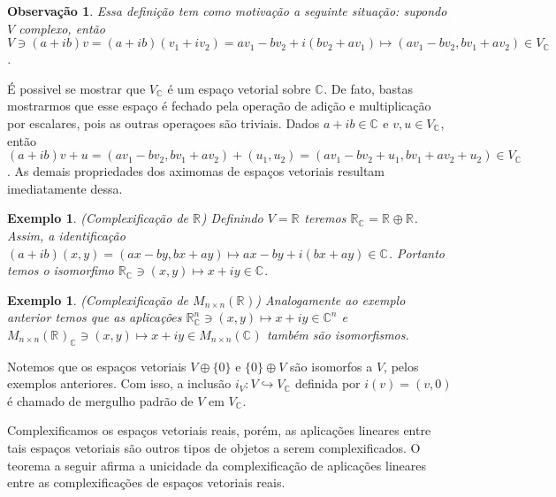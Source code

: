 \documentclass[12pt]{book}
\newtheorem{exemplo}[teorema]{Exemplo}
\newtheorem{observacao}[teorema]{Observação}
\newcommand{\complexificacao}[1]{#1_{\complexo{}}}
\newcommand{\complexo}[1]{\mathbb{C}^{#1}}
\newcommand{\matrizquadcomplexa}[1]{M_{#1 \times #1}(\complexo{})}
\newcommand{\matrizquadreal}[1]{M_{#1 \times #1}(\real{})}
\newcommand{\real}[1]{\mathbb{R}^{#1}}
\newcommand{\reta}{\real{}}
\begin{document}
	\begin{observacao}
		Essa definição tem como motivação a seguinte situação: supondo $V$ complexo, então $V \ni (a+ib)v = (a+ib)(v_{1}+iv_{2}) = av_{1}-bv_{2}+i(bv_{2}+av_{1}) \mapsto (av_{1}-bv_{2}, bv_{1}+ av_{2}) \in \complexificacao{V}$.
	\end{observacao}
	
	É possivel se mostrar que $\complexificacao{V}$ é um espaço vetorial sobre $\complexo{}$. De fato, bastas mostrarmos que esse espaço é fechado pela operação de adição e multiplicação por escalares, pois as outras operaçoes são triviais. Dados $a+ib \in \complexo{}$ e $v,u \in \complexificacao{V}$, então $(a+ib )v+u = (av_{1}-bv_{2}, bv_{1}+ av_{2}) + (u_{1}, u_{2}) = (av_{1}-bv_{2} + u_{1}, bv_{1}+ av_{2} + u_{2}) \in \complexificacao{V}$. As demais propriedades dos aximomas de espaços vetoriais resultam imediatamente dessa.
	
	\begin{exemplo}\label{exemplo_conjugado_reta_real}
		(Complexificação de $\reta$) Definindo $V = \reta$ teremos $\complexificacao{\reta} = \reta\oplus \reta$. Assim, a identificação $(a+ib)(x, y ) = (ax-by, bx+ay) \mapsto ax-by+i(bx+ay) \in \complexo{}$. Portanto temos o isomorfimo $\complexificacao{\reta} \ni (x,y)\mapsto x +iy\in \complexo{}$.
	\end{exemplo}
	
	\begin{exemplo}\label{exemplo_complexificacao_matrizes}
		(Complexificação de $\matrizquadreal{n}$) Analogamente ao exemplo anterior temos que as aplicações $\complexificacao{\real{n}} \ni (x,y) \mapsto x+iy \in \complexo{n}$ e  $\complexificacao{\matrizquadreal{n}} \ni (x,y) \mapsto x+iy \in \matrizquadcomplexa{n}$ também são isomorfismos.
	\end{exemplo}
	
	Notemos que os espaços vetoriais $V\oplus\{0\}$ e $\{0\}\oplus V$ são isomorfos a $V$, pelos exemplos anteriores. Com isso, a inclusão $i_{V} :V \hookrightarrow \complexificacao{V}$ definida por $i(v) = (v, 0)$ é chamado de mergulho padrão de $V$ em $\complexificacao{V}$.
	
	Complexificamos os espaços vetoriais reais, porém, as aplicações lineares entre tais espaços vetoriais são outros tipos de objetos a serem complexificados. O teorema a seguir afirma a unicidade da complexificação de aplicações lineares entre as complexificações de espaços vetoriais reais.
	
\end{document}
